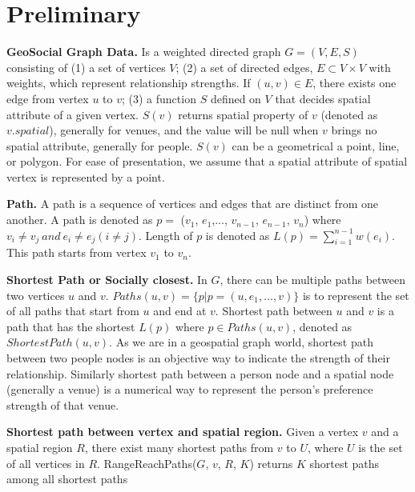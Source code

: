\section{Preliminary}
\label{sec:preliminary}


{\bf GeoSocial Graph Data.} Is a weighted directed graph $G=(V,E,S)$ consisting of (1) a set of vertices $V$; (2) a set of directed edges, $E\subset V\times V$ with weights, which represent relationship strengths. If $(u,v)\in E$, there exists one edge from vertex $u$ to $v$; (3) a function $S$ defined on $V$ that decides spatial attribute of a given vertex. $S(v)$ returns spatial property of $v$ (denoted as $v.spatial$), generally for venues, and the value will be null when $v$ brings no spatial attribute, generally for people. $S(v)$ can be a geometrical a point, line, or polygon. For ease of presentation, we assume that a spatial attribute of spatial vertex is represented by a point.

\textbf{Path.} A path is a sequence of vertices and edges that are distinct from one another. A path is denoted as $p =$ ($v_1$, $e_1$,..., $v_{n-1}$, $e_{n-1}$, $v_n$) where $v_i\neq v_j~and~e_i\neq e_j (i\neq j)$. Length of $p$ is denoted as $L(p) = \sum\limits_{i = 1}^{n-1}w(e_i)$. This path starts from vertex $v_1$ to $v_n$. 

\textbf{Shortest Path or Socially closest.} In $G$, there can be multiple paths between two vertices $u$ and $v$. $Paths(u,v) = \{p|p = (u,e_1,..., v)\}$ is to represent the set of all paths that start from $u$ and end at $v$. Shortest path between $u$ and $v$ is a path that has the shortest $L(p)$ where $p\in Paths(u,v)$, denoted as $ShortestPath(u,v)$. As we are in a geospatial graph world, shortest path between two people nodes is an objective way to indicate the strength of their relationship. Similarly shortest path between a person node and a spatial node (generally a venue) is a numerical way to represent the person's preference strength of that venue.

\textbf{Shortest path between vertex and spatial region.} Given a vertex $v$ and a spatial region $R$, there exist many shortest paths from $v$ to $U$, where $U$ is the set of all vertices in $R$. RangeReachPaths($G$, $v$, $R$, $K$) returns $K$ shortest paths among all shortest paths 

